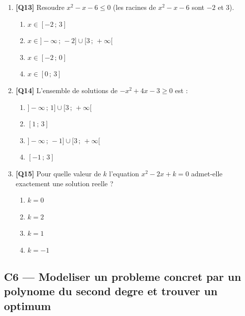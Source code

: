 \begin{enumerate}[resume]

\item \textbf{[Q13]} Resoudre $x^2 - x - 6 \leq 0$
  (les racines de $x^2 - x - 6$ sont $-2$ et $3$).

  \begin{enumerate}[label=\Alph*.]
    \item $x \in [-2\,;\,3]$
    \item $x \in ]-\infty\,;\,-2] \cup [3\,;\,+\infty[$
    \item $x \in [-2\,;\,0]$
    \item $x \in [0\,;\,3]$
  \end{enumerate}

\bigskip

\item \textbf{[Q14]} L'ensemble de solutions de $-x^2 + 4x - 3 \geq 0$ est :

  \begin{enumerate}[label=\Alph*.]
    \item $]-\infty\,;\,1] \cup [3\,;\,+\infty[$
    \item $[1\,;\,3]$
    \item $]-\infty\,;\,-1] \cup [3\,;\,+\infty[$
    \item $[-1\,;\,3]$
  \end{enumerate}

\bigskip

\item \textbf{[Q15]} Pour quelle valeur de $k$ l'equation $x^2 - 2x + k = 0$
  admet-elle exactement une solution reelle ?

  \begin{enumerate}[label=\Alph*.]
    \item $k = 0$
    \item $k = 2$
    \item $k = 1$
    \item $k = -1$
  \end{enumerate}

\end{enumerate}

\bigskip

\subsection*{C6 — Modeliser un probleme concret par un polynome du second degre et trouver un optimum}

